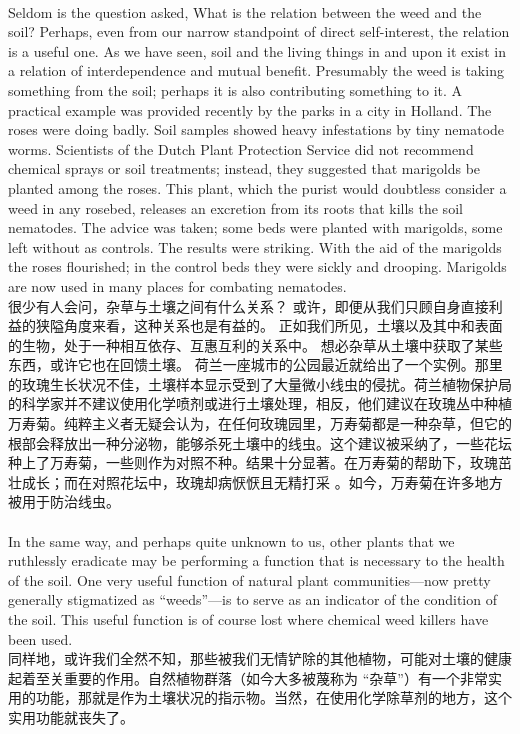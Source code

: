 \documentclass{article}
\begin{document}
\\
Seldom is the question asked, What is the relation between the weed and the soil? Perhaps, even from our narrow standpoint of direct self-interest, the relation is a useful one. As we have seen, soil and the living things in and upon it exist in a relation of interdependence and mutual benefit. Presumably the weed is taking something from the soil; perhaps it is also contributing something to it. A practical example was provided recently by the parks in a city in Holland. The roses were doing badly. Soil samples showed heavy infestations by tiny nematode worms. Scientists of the Dutch Plant Protection Service did not recommend chemical sprays or soil treatments; instead, they suggested that marigolds be planted among the roses. This plant, which the purist would doubtless consider a weed in any rosebed, releases an excretion from its roots that kills the soil nematodes. The advice was taken; some beds were planted with marigolds, some left without as controls. The results were striking. With the aid of the marigolds the roses flourished; in the control beds they were sickly and drooping. Marigolds are now used in many places for combating nematodes.\\
很少有人会问，杂草与土壤之间有什么关系？ 或许，即便从我们只顾自身直接利益的狭隘角度来看，这种关系也是有益的。 正如我们所见，土壤以及其中和表面的生物，处于一种相互依存、互惠互利的关系中。 想必杂草从土壤中获取了某些东西，或许它也在回馈土壤。 荷兰一座城市的公园最近就给出了一个实例。那里的玫瑰生长状况不佳，土壤样本显示受到了大量微小线虫的侵扰。荷兰植物保护局的科学家并不建议使用化学喷剂或进行土壤处理，相反，他们建议在玫瑰丛中种植万寿菊。纯粹主义者无疑会认为，在任何玫瑰园里，万寿菊都是一种杂草，但它的根部会释放出一种分泌物，能够杀死土壤中的线虫。这个建议被采纳了，一些花坛种上了万寿菊，一些则作为对照不种。结果十分显著。在万寿菊的帮助下，玫瑰茁壮成长；而在对照花坛中，玫瑰却病恹恹且无精打采 。如今，万寿菊在许多地方被用于防治线虫。 \\

\\
In the same way, and perhaps quite unknown to us, other plants that we ruthlessly eradicate may be performing a function that is necessary to the health of the soil. One very useful function of natural plant communities—now pretty generally stigmatized as “weeds”—is to serve as an indicator of the condition of the soil. This useful function is of course lost where chemical weed killers have been used.\\
同样地，或许我们全然不知，那些被我们无情铲除的其他植物，可能对土壤的健康起着至关重要的作用。自然植物群落（如今大多被蔑称为 “杂草”）有一个非常实用的功能，那就是作为土壤状况的指示物。当然，在使用化学除草剂的地方，这个实用功能就丧失了。 \\
\end{document}
